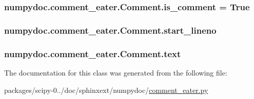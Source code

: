 \subsubsection[{is\+\_\+comment}]{\setlength{\rightskip}{0pt plus 5cm}numpydoc.\+comment\+\_\+eater.\+Comment.\+is\+\_\+comment = {\bf True}\hspace{0.3cm}{\ttfamily [static]}}\label{classnumpydoc_1_1comment__eater_1_1Comment_a33eb95a29f4ae87bd2a84170d777c8e6}
\hypertarget{classnumpydoc_1_1comment__eater_1_1Comment_a0d9283750442be9dbd8e8d34a75f0f19}{}
\subsubsection[{start\+\_\+lineno}]{\setlength{\rightskip}{0pt plus 5cm}numpydoc.\+comment\+\_\+eater.\+Comment.\+start\+\_\+lineno}\label{classnumpydoc_1_1comment__eater_1_1Comment_a0d9283750442be9dbd8e8d34a75f0f19}
\hypertarget{classnumpydoc_1_1comment__eater_1_1Comment_a8efe2991f958dcbd6afba6583ad41a79}{}
\subsubsection[{text}]{\setlength{\rightskip}{0pt plus 5cm}numpydoc.\+comment\+\_\+eater.\+Comment.\+text}\label{classnumpydoc_1_1comment__eater_1_1Comment_a8efe2991f958dcbd6afba6583ad41a79}


The documentation for this class was generated from the following file\+:\begin{DoxyCompactItemize}
\item 
packages/scipy-\/0../doc/sphinxext/numpydoc/\hyperlink{comment__eater_8py}{comment\+\_\+eater.\+py}\end{DoxyCompactItemize}
